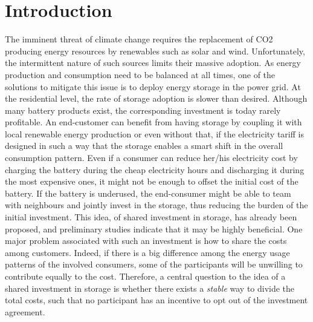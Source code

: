 \section{Introduction}

The imminent threat of climate change requires the replacement of CO2 producing energy resources by renewables such as solar and wind. Unfortunately, the intermittent nature of such sources limits their massive adoption.
As energy production and consumption need to be balanced at all times, one of the solutions to mitigate this issue is to deploy energy storage in the power grid.
At the residential level, the rate of storage adoption is slower than desired. Although many battery products exist, the corresponding investment is today rarely profitable.
An end-customer can benefit from having storage by coupling it with local renewable energy production or even without that, if the electricity tariff is designed in such a way that the storage enables a smart shift in the overall consumption pattern. 
Even if a consumer can reduce her/his electricity cost by charging the battery during the cheap electricity hours and discharging it during the most expensive ones, it might not be enough to offset the initial cost of the battery.
If the battery is underused, the end-consumer might be able to team with neighbours and jointly invest in the storage, thus reducing the burden of the initial investment.
This idea, of shared investment in storage, has already been proposed, and preliminary studies indicate that it may be highly beneficial.
One major problem associated with such an investment is how to share the costs among customers.
Indeed, if there is a big difference among the energy usage patterns of the involved consumers, some of the participants will be unwilling to contribute equally to the cost.
Therefore, a central question to the idea of a shared investment in storage is whether there exists a \textit{stable} way to divide the total costs, such that no participant has an incentive to opt out of the investment agreement.

